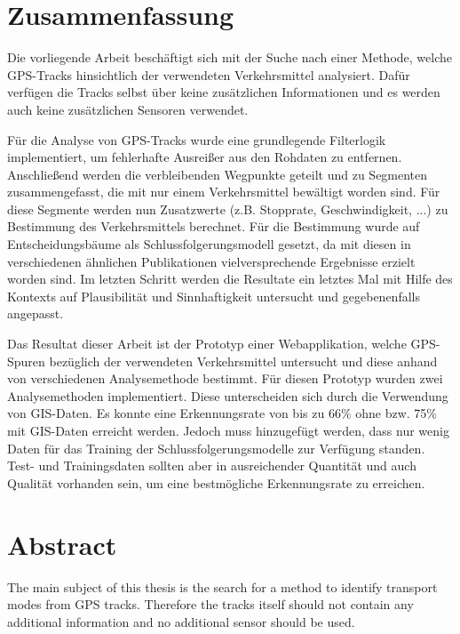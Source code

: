\section*{Zusammenfassung}

Die vorliegende Arbeit beschäftigt sich mit der Suche nach einer Methode, welche GPS-Tracks hinsichtlich der verwendeten Verkehrsmittel analysiert. Dafür verfügen die Tracks selbst über keine zusätzlichen Informationen und es werden auch keine zusätzlichen Sensoren verwendet.

Für die Analyse von GPS-Tracks wurde eine grundlegende Filterlogik implementiert, um fehlerhafte Ausreißer aus den Rohdaten zu entfernen. Anschließend werden die verbleibenden Wegpunkte geteilt und zu Segmenten zusammengefasst, die mit nur einem Verkehrsmittel bewältigt worden sind. Für diese Segmente werden nun Zusatzwerte (z.B. Stopprate, Geschwindigkeit, ...) zu Bestimmung des Verkehrsmittels berechnet. Für die Bestimmung wurde auf Entscheidungsbäume als Schlussfolgerungsmodell gesetzt, da mit diesen in verschiedenen ähnlichen Publikationen vielversprechende Ergebnisse erzielt worden sind. Im letzten Schritt werden die Resultate ein letztes Mal mit Hilfe des Kontexts auf Plausibilität und Sinnhaftigkeit untersucht und gegebenenfalls angepasst.

Das Resultat dieser Arbeit ist der Prototyp einer Webapplikation, welche GPS-Spuren bezüglich der verwendeten Verkehrsmittel untersucht und diese anhand von verschiedenen Analysemethode bestimmt. Für diesen Prototyp wurden zwei Analysemethoden implementiert. Diese unterscheiden sich durch die Verwendung von GIS-Daten. Es konnte eine Erkennungsrate von bis zu 66\% ohne bzw. 75\% mit GIS-Daten erreicht werden. Jedoch muss hinzugefügt werden, dass nur wenig Daten für das Training der Schlussfolgerungsmodelle zur Verfügung standen. Test- und Trainingsdaten sollten aber  in ausreichender Quantität und auch Qualität vorhanden sein, um eine bestmögliche Erkennungsrate zu erreichen.

\afterpage{\blankpage}
\newpage

\section*{Abstract}

The main subject of this thesis is the search for a method to identify transport modes from GPS tracks. Therefore the tracks itself should not contain any additional information and no additional sensor should be used.

